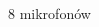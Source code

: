 \begin{frame}{}
\begin{columns}
\begin{column}{0.5\textwidth}
\begin{figure}
                \caption{8 mikrofonów}
            \end{figure}
        \end{column}
    \end{columns}
\end{frame}